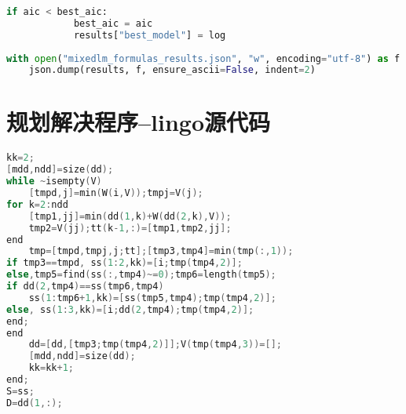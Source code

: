 \documentclass[withoutpreface,bwprint]{cumcmthesis} %
\begin{document}
\begin{appendices}
\begin{lstlisting}[language=python]
        if aic < best_aic:
            best_aic = aic
            results["best_model"] = log
    
with open("mixedlm_formulas_results.json", "w", encoding="utf-8") as f:
    json.dump(results, f, ensure_ascii=False, indent=2)
 \end{lstlisting}

 \section{规划解决程序--lingo源代码}

\begin{lstlisting}[language=c]
kk=2;
[mdd,ndd]=size(dd);
while ~isempty(V)
    [tmpd,j]=min(W(i,V));tmpj=V(j);
for k=2:ndd
    [tmp1,jj]=min(dd(1,k)+W(dd(2,k),V));
    tmp2=V(jj);tt(k-1,:)=[tmp1,tmp2,jj];
end
    tmp=[tmpd,tmpj,j;tt];[tmp3,tmp4]=min(tmp(:,1));
if tmp3==tmpd, ss(1:2,kk)=[i;tmp(tmp4,2)];
else,tmp5=find(ss(:,tmp4)~=0);tmp6=length(tmp5);
if dd(2,tmp4)==ss(tmp6,tmp4)
    ss(1:tmp6+1,kk)=[ss(tmp5,tmp4);tmp(tmp4,2)];
else, ss(1:3,kk)=[i;dd(2,tmp4);tmp(tmp4,2)];
end;
end
    dd=[dd,[tmp3;tmp(tmp4,2)]];V(tmp(tmp4,3))=[];
    [mdd,ndd]=size(dd);
    kk=kk+1;
end;
S=ss;
D=dd(1,:);
 \end{lstlisting}
\end{appendices}
\end{document}
